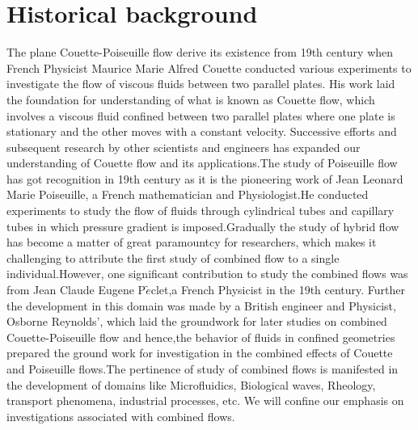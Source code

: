 \documentclass[14pt,one side, a4paper]{extbook}
\begin{document}
	 	\section{Historical background}
	 	The plane Couette-Poiseuille flow derive its existence from 19th century when French Physicist Maurice Marie Alfred Couette conducted various experiments to investigate the flow of viscous fluids between two parallel plates. His work laid the foundation for understanding of what is known as Couette flow, which involves a viscous fluid confined between two parallel plates where one plate is stationary and the other moves with a constant velocity. Successive efforts and subsequent research by other scientists and engineers has expanded our understanding of Couette flow and its applications.The study of Poiseuille flow has got recognition in 19th century as it is the pioneering work of Jean Leonard Marie Poiseuille, a French mathematician and Physiologist.He conducted experiments to study the flow of fluids through cylindrical tubes and capillary tubes  in which pressure gradient is imposed.Gradually the study of hybrid flow has become a matter of great paramountcy for researchers, which makes it challenging to attribute the first study of combined flow to a single individual.However, one significant contribution to study the combined flows was from  Jean Claude Eugene P$\tilde{e}$clet,a French Physicist in the 19th century. Further the development in this domain was made by a British engineer and Physicist, Osborne Reynolds’, which laid the groundwork for later studies on combined Couette-Poiseuille flow and hence,the behavior of fluids in confined geometries prepared the ground work for investigation in the combined effects of Couette and Poiseuille flows.The pertinence of study of combined flows is  manifested in the development of domains like  Microfluidics, Biological waves, Rheology, transport phenomena, industrial processes, etc. We will confine our emphasis on investigations associated with combined flows.
\end{document}
